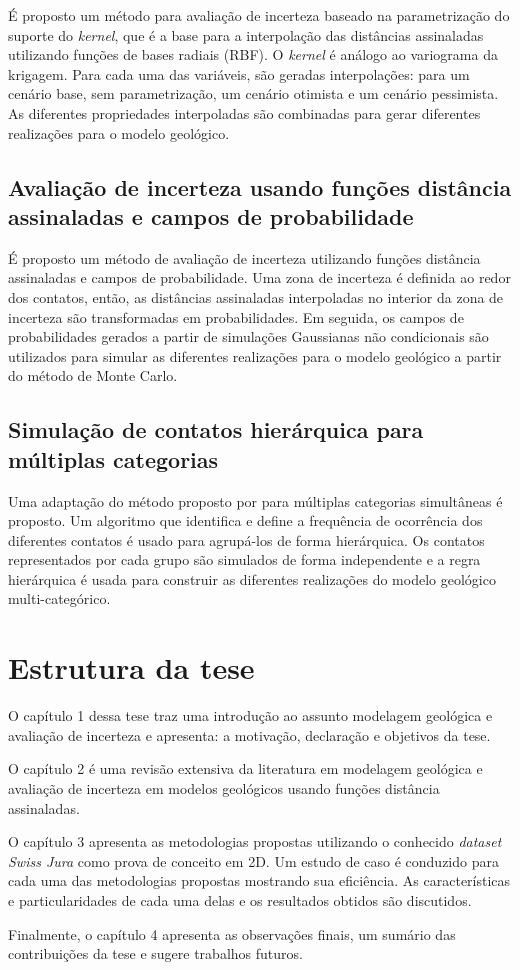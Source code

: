 É proposto um método para avaliação de incerteza baseado na parametrização do suporte do \textit{kernel}, que é a base para a interpolação das distâncias assinaladas utilizando funções de bases radiais (RBF). O \textit{kernel} é análogo ao variograma da krigagem. Para cada uma das variáveis, são geradas interpolações: para um cenário base, sem parametrização, um cenário otimista e um cenário pessimista. As diferentes propriedades interpoladas são combinadas para gerar diferentes realizações para o modelo geológico.  

\subsection{Avaliação de incerteza usando funções distância assinaladas e campos de probabilidade}

É proposto um método de avaliação de incerteza utilizando funções distância assinaladas e campos de probabilidade. Uma zona de incerteza é definida ao redor dos contatos, então, as distâncias assinaladas interpoladas no interior da zona de incerteza são transformadas em probabilidades. Em seguida, os campos de probabilidades gerados a partir de simulações Gaussianas não condicionais são utilizados para simular as diferentes realizações para o modelo geológico a partir do método de Monte Carlo.

\subsection{Simulação de contatos hierárquica para múltiplas categorias}

Uma adaptação do método proposto por  para múltiplas categorias simultâneas é proposto. Um algoritmo que identifica e define a frequência de ocorrência dos diferentes contatos é usado para agrupá-los de forma hierárquica. Os contatos representados por cada grupo são simulados de forma independente e a regra hierárquica é usada para construir as diferentes realizações do modelo geológico multi-categórico. 

\section{Estrutura da tese}

O capítulo 1 dessa tese traz uma introdução ao assunto modelagem geológica e avaliação de incerteza e apresenta: a motivação, declaração e objetivos da tese.

O capítulo 2 é uma revisão extensiva da literatura em modelagem geológica e avaliação de incerteza em modelos geológicos usando funções distância assinaladas. 

O capítulo 3 apresenta as metodologias propostas utilizando o conhecido \textit{dataset} \textit{Swiss Jura} \cite{goovaerts1997geostatistics} como prova de conceito em 2D. Um estudo de caso é conduzido para cada uma das metodologias propostas mostrando sua eficiência. As características e particularidades de cada uma delas e os resultados obtidos são discutidos.

Finalmente, o capítulo 4 apresenta as observações finais, um sumário das contribuições da tese e sugere trabalhos futuros.